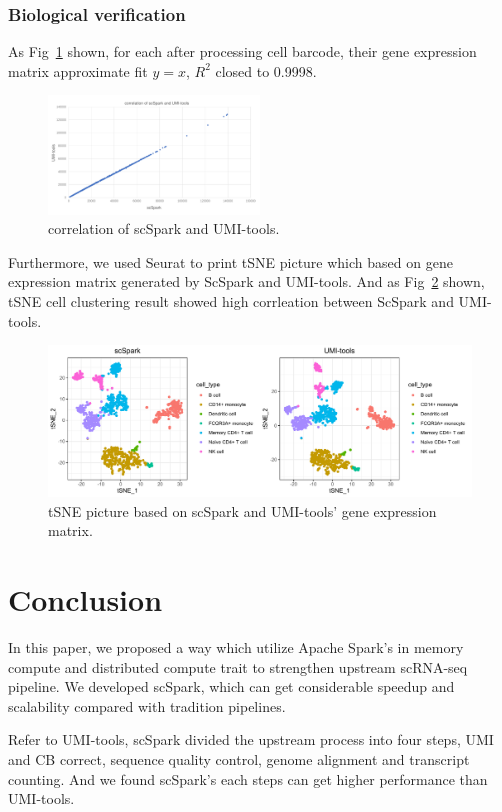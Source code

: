 \documentclass[conference]{IEEEtran}
\begin{document}
\subsubsection{Biological verification} 
As Fig~\ref{fig9} shown, for each after processing cell barcode, their gene expression matrix approximate fit $y=x$, $R^{2}$ closed to 0.9998. 
\begin{figure}
  \includegraphics[width=0.5\textwidth]{fig9.pdf}
  \caption{correlation of scSpark and UMI-tools.} \label{fig9}
\end{figure}
Furthermore, we used Seurat to print tSNE picture which based on gene expression matrix generated by ScSpark and UMI-tools. 
And as Fig~\ref{fig10} shown, tSNE cell clustering result showed high corrleation between ScSpark and UMI-tools. 
\begin{figure}
  \includegraphics[width=\textwidth]{fig10.pdf}
  \caption{tSNE picture based on scSpark and UMI-tools' gene expression matrix.} \label{fig10}
\end{figure}

\section{Conclusion}
In this paper, we proposed a way which utilize Apache Spark's in memory compute and distributed compute trait to strengthen upstream scRNA-seq pipeline.
We developed scSpark, which can get considerable speedup and scalability compared with tradition pipelines.

Refer to UMI-tools, scSpark divided the upstream process into four steps, UMI and CB correct, sequence quality control, genome alignment and transcript counting.
And we found scSpark's each steps can get higher performance than UMI-tools.



\end{document}

